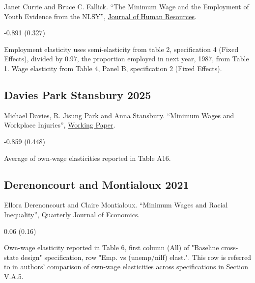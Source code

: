 \noindent Janet Currie and Bruce C. Fallick. ``The Minimum Wage and the Employment of Youth Evidence from the NLSY'', \href{https://doi.org/10.2307/146069}{Journal of Human Resources}.

\vspace{0.7em}

 -0.891 (0.327)

\vspace{0.7em}

 Employment elasticity uses semi-elasticity from table 2, specification 4 (Fixed Effects), divided by 0.97, the proportion employed in next year, 1987, from Table 1. Wage elasticity from Table 4, Panel B, specification 2 (Fixed Effects).

\subsection*{Davies Park Stansbury 2025}
\vspace{-0.7em}

\noindent Michael Davies, R. Jisung Park and Anna Stansbury. ``Minimum Wages and Workplace Injuries'', \href{https://dx.doi.org/10.2139/ssrn.5062047}{Working Paper}.

\vspace{0.7em}

 -0.859 (0.448)

\vspace{0.7em}

 Average of own-wage elasticities reported in Table A16.

\subsection*{Derenoncourt and Montialoux 2021}
\vspace{-0.7em}

\noindent Ellora Derenoncourt and Claire Montialoux. ``Minimum Wages and Racial Inequality'', \href{https://doi.org/10.1093/qje/qjaa031}{Quarterly Journal of Economics}.

\vspace{0.7em}

 0.06 (0.16)

\vspace{0.7em}

 Own-wage elasticity reported in Table 6, first column (All) of "Baseline cross-state design" specification, row "Emp. vs (unemp/nilf) elast.". This row is referred to in authors' comparison of own-wage elasticities across specifications in Section V.A.5.

